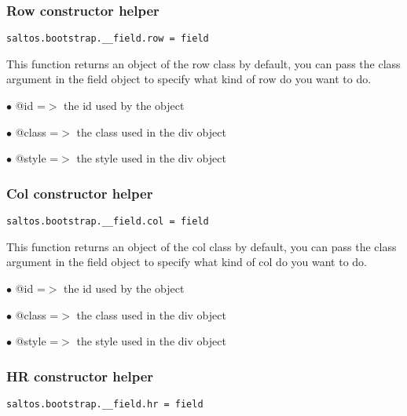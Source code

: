 \documentclass[a4paper]{article}
\begin{document}
\hypertarget{toc605}{}
\subsubsection{Row constructor helper}

\begin{lstlisting}
saltos.bootstrap.__field.row = field
\end{lstlisting}

This function returns an object of the row class by default, you can pass the class argument
in the field object to specify what kind of row do you want to do.

\begin{compactitem}
\item[\color{myblue}$\bullet$] @id    =$>$ the id used by the object
\item[\color{myblue}$\bullet$] @class =$>$ the class used in the div object
\item[\color{myblue}$\bullet$] @style =$>$ the style used in the div object
\end{compactitem}

\hypertarget{toc606}{}
\subsubsection{Col constructor helper}

\begin{lstlisting}
saltos.bootstrap.__field.col = field
\end{lstlisting}

This function returns an object of the col class by default, you can pass the class argument
in the field object to specify what kind of col do you want to do.

\begin{compactitem}
\item[\color{myblue}$\bullet$] @id    =$>$ the id used by the object
\item[\color{myblue}$\bullet$] @class =$>$ the class used in the div object
\item[\color{myblue}$\bullet$] @style =$>$ the style used in the div object
\end{compactitem}

\hypertarget{toc607}{}
\subsubsection{HR constructor helper}

\begin{lstlisting}
saltos.bootstrap.__field.hr = field
\end{lstlisting}
\end{document}
